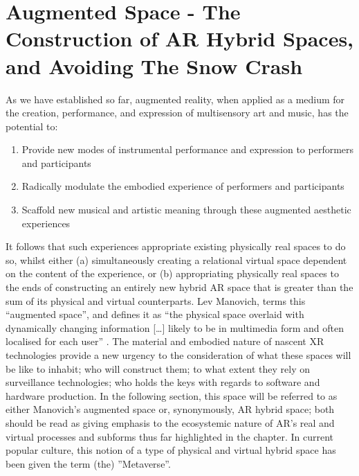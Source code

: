 \section[Augmented Space]{Augmented Space - The Construction of AR Hybrid Spaces, and Avoiding The Snow Crash}
As we have established so far, augmented reality, when applied as a medium for the creation, performance, and expression of multisensory art and music, has the potential to:
\begin{enumerate}
    \item Provide new modes of instrumental performance and expression to performers and participants
    \item Radically modulate the embodied experience of performers and participants
    \item Scaffold new musical and artistic meaning through these augmented aesthetic experiences
\end{enumerate}
It follows that such experiences appropriate existing physically real spaces to do so, whilst either (a) simultaneously creating a relational virtual space dependent on the content of the experience, or (b) appropriating physically real spaces to the ends of constructing an entirely new hybrid AR space that is greater than the sum of its physical and virtual counterparts. Lev Manovich, terms this “augmented space”, and defines it as “the physical space overlaid with dynamically changing information […] likely to be in multimedia form and often localised for each user” \citep[p. 2]{manovich2006}. The material and embodied nature of nascent XR technologies provide a new urgency to the consideration of what these spaces will be like to inhabit; who will construct them; to what extent they rely on surveillance technologies; who holds the keys with regards to software and hardware production. In the following section, this space will be referred to as either Manovich’s augmented space or, synonymously, AR hybrid space; both should be read as giving emphasis to the ecosystemic nature of AR’s real and virtual processes and subforms thus far highlighted in the chapter.  In current popular culture, this notion of a type of physical and virtual hybrid space has been given the term (the) ”Metaverse”.

